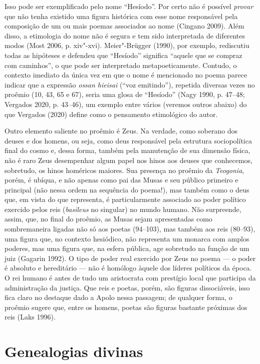 Isso pode ser exemplificado pelo nome ``Hesíodo''. Por certo não é
possível \emph{provar} que não tenha existido uma figura histórica com
esse nome responsável pela composição de um ou mais poemas associados ao
nome (Cingano 2009). Além disso, a etimologia do nome não é segura e tem
sido interpretada de diferentes modos (Most 2006, p. xiv"-xvi).
Meier"-Brügger (1990), por exemplo, rediscutiu todas as hipóteses e
defendeu que ``Hesíodo'' significa ``aquele que se compraz com
caminhos'', o que pode ser interpretado metapoeticamente. Contudo, o
contexto imediato da única vez em que o nome é mencionado no poema
parece indicar que a expressão \emph{ossan hieisai} (``voz emitindo''),
repetida diversas vezes no proêmio (10, 43, 65 e 67), seria uma glosa de
``Hesíodo'' (Nagy 1990, p. 47--48; Vergados 2020, p. 43--46), um exemplo
entre vários (veremos outros abaixo) do que Vergados (2020) define como
o pensamento etimológico do autor.

Outro elemento saliente no proêmio é Zeus. Na verdade, como soberano dos
deuses e dos homens, ou seja, como deus responsável pela estrutura
sociopolítica final do cosmo e, dessa forma, também pela manutenção de
sua dimensão física, não é raro Zeus desempenhar algum papel nos hinos
aos deuses que conhecemos, sobretudo, os hinos homéricos maiores. Sua
presença no proêmio da \emph{Teogonia}, porém, é ubíqua, e não apenas
como pai das Musas e seu público primeiro e principal (não nessa ordem
na sequência do poema!), mas também como o deus que, em vista do que
representa, é particularmente associado ao poder político exercido pelos
reis (\emph{basileus} no singular) no mundo humano. Não surpreende,
assim, que, no final do proêmio, as Musas sejam apresentadas como
sombremaneira ligadas não só aos poetas (94--103), mas também aos reis
(80--93), uma figura que, no contexto hesiódico, não representa um
monarca com amplos poderes, mas uma figura que, na esfera pública, age
sobretudo na função de um juiz (Gagarin 1992). O tipo de poder real
exercido por Zeus no poema --- o poder é absoluto e hereditário --- não é
homólogo àquele dos líderes políticos da época. O rei humano é antes de
tudo um aristocrata com prestígio local que participa da administração
da justiça. Que reis e poetas, porém, são figuras dissociáveis, isso
fica claro no destaque dado a Apolo nessa passagem; de qualquer forma, o
proêmio sugere que, entre os homens, poetas são figuras bastante
próximas dos reis (Laks 1996).

\section{Genealogias divinas}

